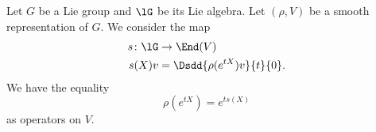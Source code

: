 \begin{proposition}       \label{PROPooXCGMooKlJlwp}
    Let \( G\) be a Lie group and \( \lG\) be its Lie algebra. Let \( (\rho, V)\) be a smooth representation of \( G\). We consider the map
    \begin{equation}
        \begin{aligned}
            s\colon \lG&\to \End(V) \\
            s(X)v&=\Dsdd{ \rho( e^{tX})v }{t}{0}.
        \end{aligned}
    \end{equation}
    We have the equality
    \begin{equation}
        \rho( e^{tX})= e^{ts(X)}
    \end{equation}
    as operators on \( V\).
\end{proposition}

